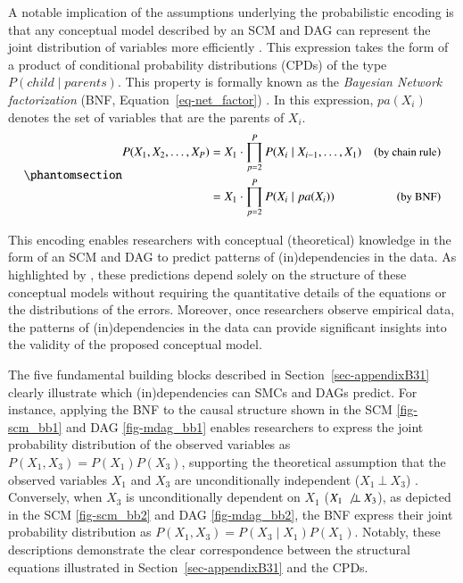 \documentclass[
  authoryear,
  review,
  1p]{elsarticle}
\begin{document}
A notable implication of the assumptions underlying the probabilistic
encoding is that any conceptual model described by an SCM and DAG can
represent the joint distribution of variables more efficiently
\citep[p.~29]{Pearl_et_al_2016}. This expression takes the form of a
product of conditional probability distributions (CPDs) of the type
\(P(child \mid parents)\). This property is formally known as the
\emph{Bayesian Network factorization} (BNF,
Equation~\ref{eq-net_factor})
\citetext{\citealp[p.~29]{Pearl_et_al_2016}; \citealp[p.~21]{Neal_2020}}.
In this expression, \(pa(X_{i})\) denotes the set of variables that are
the parents of \(X_{i}\).
\begin{equation}\protect\phantomsection\label{eq-net_factor}{
\begin{aligned}
P(X_{1}, X_{2}, \dots, X_{P}) & = X_{1} \cdot \prod^{P}_{p=2} P(X_{i} \mid X_{i-1}, \dots, X_{1}) & (\small{\text{by chain rule})}\\
& = X_{1} \cdot \prod^{P}_{p=2} P(X_{i} \mid pa(X_{i}) ) & (\small{\text{by BNF}})
\end{aligned}
}\end{equation}

This encoding enables researchers with conceptual (theoretical)
knowledge in the form of an SCM and DAG to predict patterns of
(in)dependencies in the data. As highlighted by
\citet[p.~35]{Pearl_et_al_2016}, these predictions depend solely on the
structure of these conceptual models without requiring the quantitative
details of the equations or the distributions of the errors. Moreover,
once researchers observe empirical data, the patterns of
(in)dependencies in the data can provide significant insights into the
validity of the proposed conceptual model.

The five fundamental building blocks described in
Section~\ref{sec-appendixB31} clearly illustrate which (in)dependencies
can SMCs and DAGs predict. For instance, applying the BNF to the causal
structure shown in the SCM \ref{fig-scm_bb1} and DAG \ref{fig-mdag_bb1}
enables researchers to express the joint probability distribution of the
observed variables as \(P(X_{1}, X_{3}) = P(X_{1}) P(X_{3})\),
supporting the theoretical assumption that the observed variables
\(X_{1}\) and \(X_{3}\) are unconditionally independent
(\(X_{1} \:\bot\:X_{3}\)) \citep[p.~24]{Neal_2020}. Conversely, when
\(X_{3}\) is unconditionally dependent on \(X_{1}\)
(\(X_{1} \:\not\bot\:X_{3}\)), as depicted in the SCM \ref{fig-scm_bb2}
and DAG \ref{fig-mdag_bb2}, the BNF express their joint probability
distribution as \(P(X_{1}, X_{3}) = P(X_{3} \mid X_{1}) P(X_{1})\).
Notably, these descriptions demonstrate the clear correspondence between
the structural equations illustrated in Section~\ref{sec-appendixB31}
and the CPDs.
\end{document}
